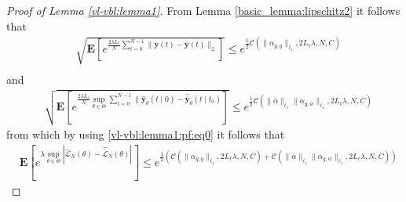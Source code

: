 \documentclass{article}
\def\rve{{\mathbf{e}}}
\def\rvy{{\mathbf{y}}}
\def\rvz{{\mathbf{z}}}
\newcommand{\y}{\mathbf{y}}
\newcommand{\bE}{\mathbf{E}}
\begin{document}
\begin{proof}[Proof of Lemma \ref{vl-vbl:lemma1}]
From Lemma \ref{basic_lemma:lipschitz2} it follows that
\begin{equation} 
\label{vl-vbl:lemma1:pf:eq1}
\begin{aligned}
    & \sqrt{\bE[e^{\frac{2 \lambda L_{\ell}}{N} \sum_{t=0}^{N-1}
    \|\y(t)-\bar{\y}(t)\|_2}]} \le e^{\frac{1}{2} \mathcal{C}(\|\alpha_{g,y}\|_{\ell_1}, 2L_{\ell}\lambda,N,C)}\\
\end{aligned}    
\end{equation}
 and %
 \begin{equation}
\label{vl-vbl:lemma1:pf:eq2}
\begin{aligned}
& \sqrt{\bE[e^{\frac{2\lambda L_{\ell}}{N} \sup_{\theta \in \Theta}\sum_{t=0}^{N-1} \|\hat{\rvy}_{\theta}(t \mid 0)-\hat{\bar{\rvy}}_{\theta}(t \mid t_0)}]} \le  e^{\frac{1}{2} \mathcal{C}(\|\bar{\alpha}\|_{\ell_1} \|\alpha_{g,w}\|_{\ell_1}, 2L_{\ell}\lambda,N,C)}
\end{aligned}
 \end{equation}
 from which by using \eqref{vl-vbl:lemma1:pf:eq0} it follows that %
 \begin{align*}
    & \bE[e^{\lambda \sup_{\theta \in \Theta} |\hat{\mathcal{L}}_N(\theta) - \hat{\bar{\mathcal{L}}}_N(\theta)|}]
    \le   e^{\frac{1}{2} (\mathcal{C}(\|\alpha_{g,y}\|_{\ell_1}, 2L_{\ell}\lambda,N,C) + \mathcal{C}(\|\bar{\alpha}\|_{\ell_1} \|\alpha_{g,w}\|_{\ell_1}, 2L_{\ell}\lambda,N,C))}  

\end{align*}
\end{proof}
\end{document}
